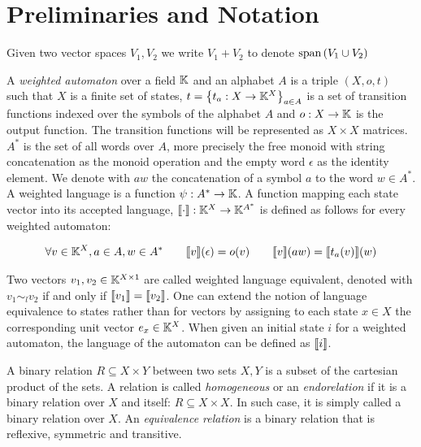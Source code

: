 \section{Preliminaries and Notation}
\label{sec:notation}

\begin{note}
  Given two vector spaces $V_1, V_2$ we write $V_1 + V_2$ to 
  denote $\text{span}\left(V_1 \cup V_2\right)$
\end{note}


\begin{defn}
  A \textit{weighted automaton} over a field $\mathbb{K}$ and an alphabet $A$ is a triple 
  $(X,o,t)$ such that $X$ is a finite set of states, 
  $t = \left\lbrace t_a : X \to \mathbb{K}^X\right\rbrace_{a \in A}$
  is a set of transition functions indexed over the symbols of the alphabet $A$ and 
  $o : X  \to \mathbb{K}$ is the output function. 
  The transition functions will be represented as $X \times X$ matrices.
  $A^*$ is the set of all words over $A$, more precisely the free monoid
  with string concatenation as the monoid operation and the empty word $\epsilon$ 
  as the identity element. We denote with $aw$ the
  concatenation of a symbol $a$ to the word $w \in A^*$.
  A weighted language is a function $\psi: A^* \to \mathbb{K}$.
  A function mapping each state vector into its 
  accepted language, $\llbracket\cdot\rrbracket: \mathbb{K}^X \to \mathbb{K}^{A^*}$ is defined as follows for 
  every weighted automaton:

  \begin{equation*}
    \begin{aligned}
      \forall v \in \mathbb{K}^X, a \in A, w \in A^* \quad \quad
      \llbracket v\rrbracket(\epsilon) = o(v) \quad \quad
      \llbracket v\rrbracket(aw) = \llbracket t_a(v)\rrbracket(w)  
    \end{aligned}
  \end{equation*}
\end{defn}

Two vectors $v_1, v_2 \in \mathbb{K}^{X\times 1}$ are called weighted language equivalent, 
denoted with  $v_1 \sim_l v_2 $ if and only if 
$ \llbracket v_1\rrbracket = \llbracket v_2\rrbracket$. One can extend the notion of language 
equivalence to states rather than for vectors by assigning 
to each state $x \in X$ the corresponding  unit vector 
$e_x \in \mathbb{K}^X$. When given an initial state $i$ for a weighted automaton, 
the language  of the automaton can be defined as $\llbracket i\rrbracket$.


\begin{defn}
  A binary relation $R \subseteq X \times Y$ between two sets $X, Y$ is a 
  subset of the 
  cartesian product of the sets. A relation is called \textit{homogeneous} 
  or an \textit
  {endorelation} if it is a binary relation over $X$ and itself: 
  $R \subseteq X \times
   X$. 
  In such case, it is simply called a binary relation over $X$.
  An \textit{equivalence relation} is a binary relation that is reflexive, 
  symmetric and
  transitive. 
\end{defn}

